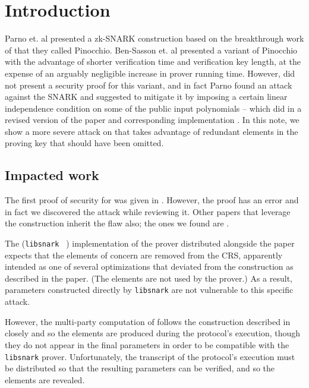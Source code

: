 \documentclass[11pt]{article}
\numberwithin{figure}{section} %
\begin{document}
\section{Introduction}

Parno et. al \cite{PGHR} presented a zk-SNARK construction based on the breakthrough work of \cite{GGPR} that they called Pinocchio.
Ben-Sasson et. al \cite{BCTV} presented a variant of Pinocchio with the advantage of shorter verification time and verification key length, at the expense of an arguably negligible increase in prover running time. However, \cite{BCTV} did not present a security proof for this variant, and in fact Parno \cite{Parno15} found an attack against the \cite{BCTV} SNARK and suggested to mitigate it by imposing a certain linear independence condition on some of the public input polynomials -- which \cite{BCTV} did in a revised version of the paper and corresponding implementation \cite{libsnark}. In this note, we show a more severe attack on \cite{BCTV} that takes advantage of redundant elements in the proving key that should have been omitted.


\subsection{Impacted work}
The first proof of security for \cite{BCTV} was given in \cite{BGG}. However, the proof has an error and in fact we discovered the attack while reviewing it.
Other papers that leverage the \cite{BCTV} construction inherit the flaw also; the ones we found are \cite{Adsnark,Fuchsbauer18}.

The (\texttt{libsnark} ~\cite{libsnark}) implementation of the \cite{BCTV} prover distributed alongside the paper expects that the elements of concern are removed from the CRS, apparently intended as one of several optimizations that deviated from the construction as described in the paper. (The elements are not used by the prover.) As a result, parameters constructed directly by \texttt{libsnark} are not vulnerable to this specific attack.

However, the multi-party computation of \cite{BGG} follows the construction described in \cite{BCTV} closely and so the elements are produced during the protocol's execution, though they do not appear in the final parameters in order to be compatible with the \texttt{libsnark} prover. Unfortunately, the transcript of the protocol's execution must be distributed so that the resulting parameters can be verified, and so the elements are revealed.
\end{document}
